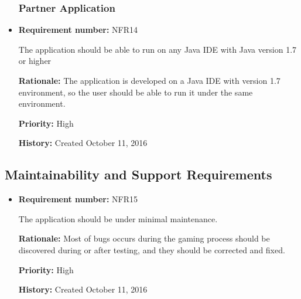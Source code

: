 \documentclass[12pt,letterpaper]{article}
\begin{document}
\begin{reqbox}
	\begin{itemize}
\subsubsection{Partner Application}

	\item \textbf{Requirement number: }NFR14

	The application should be able to run on any Java IDE with Java version 1.7 or higher

	\textbf{Rationale: }The application is developed on a Java IDE with version 1.7 environment, so the user should be able to run it under the same environment. 

	\textbf{Priority: }High

	\textbf{History: }Created October 11, 2016
	\end{itemize}
\end{reqbox}


\subsection{Maintainability and Support Requirements}

\begin{reqbox}
	\begin{itemize}
\subsubsection{Maintenance Requirement}

	\item \textbf{Requirement number: }NFR15

	The application should be under minimal maintenance.

	\textbf{Rationale: }Most of bugs occurs during the gaming process should be discovered during or after testing, and they should be corrected and fixed.

	\textbf{Priority: }High

	\textbf{History: }Created October 11, 2016

	\end{itemize}
\end{reqbox}
\end{document}
